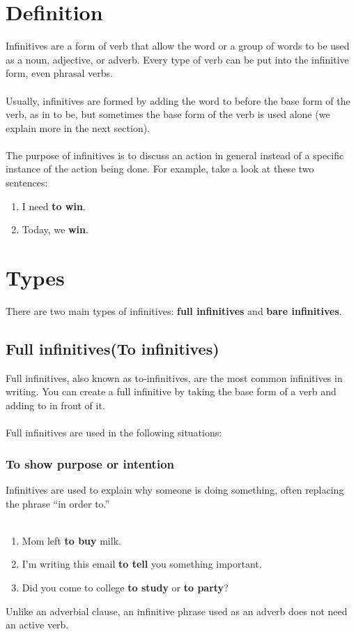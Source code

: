 \chapter{Definition}
Infinitives are a form of verb that allow the word or a group of words to be used as a noun, adjective, or adverb. 
Every type of verb can be put into the infinitive form, even phrasal verbs.\\\\
Usually, infinitives are formed by adding the word to before the base form of the verb, as in to be, 
but sometimes the base form of the verb is used alone (we explain more in the next section).\\\\
The purpose of infinitives is to discuss an action in general instead of a specific instance of the action being done. 
For example, take a look at these two sentences:
\begin{enumerate}
    \item[] I need \textbf{to win}. 
    \item[] Today, we \textbf{win}. 
\end{enumerate}



\chapter{Types}
There are two main types of infinitives: \textbf{full infinitives} and \textbf{bare infinitives}.
\vspace{1cm}
\section{Full infinitives(To infinitives)}
Full infinitives, also known as to-infinitives, are the most common infinitives in writing. 
You can create a full infinitive by taking the base form of a verb and adding to in front of it.\\\\
Full infinitives are used in the following situations:



\subsection{To show purpose or intention}
Infinitives are used to explain why someone is doing something, often replacing the phrase “in order to.”\\\\
\begin{enumerate}
    \item[] Mom left \textbf{to buy} milk.  
    \item[] I’m writing this email \textbf{to tell} you something important.
    \item[] Did you come to college \textbf{to study} or \textbf{to party}? 
\end{enumerate}
Unlike an adverbial clause, an infinitive phrase used as an adverb does not need an active verb. 



